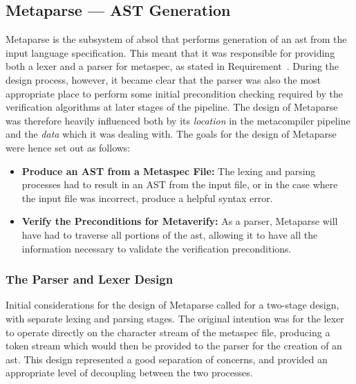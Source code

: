 

\subsection{Metaparse --- AST Generation} %
\label{sub:metaparse_ast_generation}
Metaparse is the subsystem of \gls{absol} that performs generation of an \gls{ast} from the input language specification.
This meant that it was responsible for providing both a \gls{lexer} and a \gls{parser} for \gls{metaspec}, as stated in Requirement~.
During the design process, however, it became clear that the parser was also the most appropriate place to perform some initial precondition checking required by the verification algorithms at later stages of the pipeline. 
The design of Metaparse was therefore heavily influenced both by its \textit{location} in the metacompiler pipeline and the \textit{data} which it was dealing with.
The goals for the design of Metaparse were hence set out as follows:
\begin{itemize}
    \item \textbf{Produce an AST from a Metaspec File:} The lexing and parsing processes had to result in an AST from the input file, or in the case where the input file was incorrect, produce a helpful syntax error. 
    \item \textbf{Verify the Preconditions for Metaverify:} As a parser, Metaparse will have had to traverse all portions of the \gls{ast}, allowing it to have all the information necessary to validate the verification preconditions.
\end{itemize}

\subsubsection{The Parser and Lexer Design} %
\label{ssub:the_parser_and_lexer_design}
Initial considerations for the design of Metaparse called for a two-stage design, with separate lexing and parsing stages. 
The original intention was for the lexer to operate directly on the character stream of the \gls{metaspec} file, producing a token stream which would then be provided to the parser for the creation of an \gls{ast}. 
This design represented a good separation of concerns, and provided an appropriate level of decoupling between the two processes. \\

